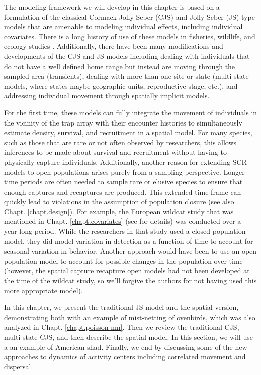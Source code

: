 The modeling framework we will develop in this chapter is based on a
formulation of the classical Cormack-Jolly-Seber (CJS) and Jolly-Seber
(JS) type models \citep{cormack:1964, jolly:1965, seber:1965} that are
amenable to modeling individual effects, including individual
covariates.  There is a long history of use of these models in
fisheries, wildlife, and ecology studies \citep{pollock_etal:1990,
  lebreton_etal:1992, pradel:1996, williams_etal:2002,
  schwarz_arnason:2005, gimenez:2007}.  Additionally, there have been
many modifications and developments of the CJS and JS models including
dealing with individuals that do not have a well defined home range
but instead are moving through the sampled area (transients), dealing
with more than one site or state (multi-state models, where states
maybe geographic units, reproductive stage, etc.), and addressing
individual movement through spatially implicit models.
 
For the first time, these models can fully integrate the movement of
individuals in the vicinity of the trap array with their encounter
histories to simultaneously estimate density, survival, and
recruitment in a spatial model.  For many species, such as those that
are rare or not often observed by researchers, this allows inferences
to be made about survival and recruitment without having to physically
capture individuals.  Additionally, another reason for extending SCR
models to open populations arises purely from a sampling perspective.
Longer time periods are often needed to sample rare or elusive species
to ensure that enough captures and recaptures are produced.  This
extended time frame can quickly lead to violations in the assumption
of population closure (see also Chapt. \ref{chapt.design}).  For
example, the European wildcat study that was mentioned in
Chapt. \ref{chapt.covariates} (see \citet{kery_etal:2011} for details)
was conducted over a year-long period.  While the researchers in that
study used a closed population model, they did model variation in
detection as a function of time to account for seasonal variation in
behavior.  Another approach would have been to use an open population
model to account for possible changes in the population over time
(however, the spatial capture recapture open models had not been
developed at the time of the wildcat study, so we'll forgive the
authors for not having used this more appropriate model).

In this chapter, we present the traditional JS model and the spatial
version, demonstrating both with an example of mist-netting of
ovenbirds, which was also analyzed in Chapt. \ref{chapt.poisson-mn}.
Then we review the traditional CJS, multi-state CJS, and then describe
the spatial model.  In this section, we will use a an example of
American shad.  Finally, we end by discussing some of the new
approaches to dynamics of activity centers including correlated
movement and dispersal.


